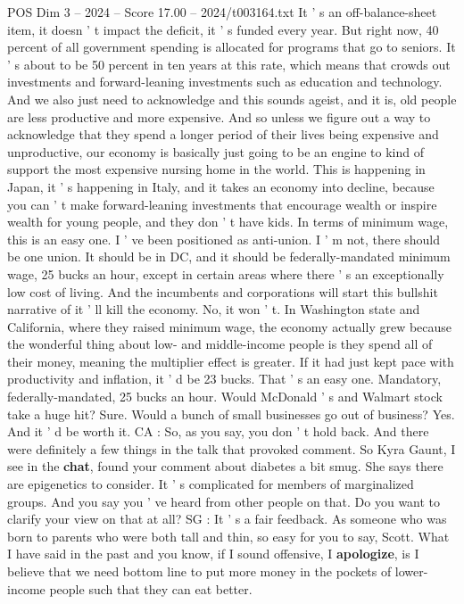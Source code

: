 \begin{textsample}{POS Dim 3 – 2024 – Score 17.00 – 2024/t003164.txt}
It ' s an off-balance-sheet item, it doesn ' t impact the deficit, it ' s funded every year.
But right now, 40 percent of all government spending is allocated for programs that go to seniors.
It ' s about to be 50 percent in ten years at this rate, which means that crowds out investments and forward-leaning investments such as education and technology.
And we also just need to acknowledge and this sounds ageist, and it is, old people are less productive and more expensive.
And so unless we figure out a way to acknowledge that they spend a longer period of their lives being expensive and unproductive, our economy is basically just going to be an engine to kind of support the most expensive nursing home in the world.
This is happening in Japan, it ' s happening in Italy, and it takes an economy into decline, because you can ' t make forward-leaning investments that encourage wealth or inspire wealth for young people, and they don ' t have kids.
In terms of minimum wage, this is an easy one.
I ' ve been positioned as anti-union.
I ' m not, there should be one union.
It should be in DC, and it should be federally-mandated minimum wage, 25 bucks an hour, except in certain areas where there ' s an exceptionally low cost of living.
And the incumbents and corporations will start this bullshit narrative of it ' ll kill the economy.
No, it won ' t.
In Washington state and California, where they raised minimum wage, the economy actually grew because the wonderful thing about low- and middle-income people is they spend all of their money, meaning the multiplier effect is greater.
If it had just kept pace with productivity and inflation, it ' d be 23 bucks.
That ' s an easy one.
Mandatory, federally-mandated, 25 bucks an hour.
Would McDonald ' s and Walmart stock take a huge hit?
Sure.
Would a bunch of small businesses go out of business?
Yes.
And it ' d be worth it.
CA : So, as you say, you don ' t hold back.
And there were definitely a few things in the talk that provoked comment.
So Kyra Gaunt, I see in the \textbf{chat}, found your comment about diabetes a bit smug.
She says there are epigenetics to consider.
It ' s complicated for members of marginalized groups.
And you say you ' ve heard from other people on that.
Do you want to clarify your view on that at all?
SG : It ' s a fair feedback.
As someone who was born to parents who were both tall and thin, so easy for you to say, Scott.
What I have said in the past and you know, if I sound offensive, I \textbf{apologize}, is I believe that we need bottom line to put more money in the pockets of lower-income people such that they can eat better.

\end{textsample}
